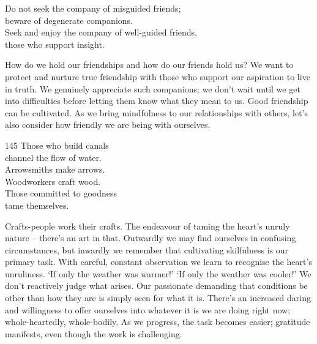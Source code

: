 
\begin{dhpVerse}{78}
\label{dhp-78}
Do not seek the company of misguided friends;\\
beware of degenerate companions.\\
Seek and enjoy the company of well-guided friends,\\
those who support insight.
\end{dhpVerse}

\begin{dhpRefl}

How do we hold our friendships and how do our friends hold us? We
want to protect and nurture true friendship with those who support
our aspiration to live in truth. We genuinely appreciate such
companions; we don't wait until we get into difficulties before
letting them know what they mean to us. Good friendship can be
cultivated. As we bring mindfulness to our relationships with others,
let's also consider how friendly we are being with ourselves.

\end{dhpRefl}


\begin{dhpVerse}{145}
\label{dhp-145}
Those who build canals\\
channel the flow of water.\\
Arrowsmiths make arrows.\\
Woodworkers craft wood.\\
Those committed to goodness\\
tame themselves.
\end{dhpVerse}

\begin{dhpRefl}

Crafts-people work their crafts. The endeavour of taming the heart's
unruly nature -- there's an art in that. Outwardly we may find
ourselves in confusing circumstances, but inwardly we remember that
cultivating skilfulness is our primary task. With careful, constant
observation we learn to recognise the heart's unruliness. `If only
the weather was warmer!' `If only the weather was cooler!' We don't
reactively judge what arises. Our passionate demanding that
conditions be other than how they are is simply seen for what it is.
There's an increased daring and willingness to offer ourselves into
whatever it is we are doing right now; whole-heartedly, whole-bodily.
As we progress, the task becomes easier; gratitude manifests, even
though the work is challenging.

\end{dhpRefl}

